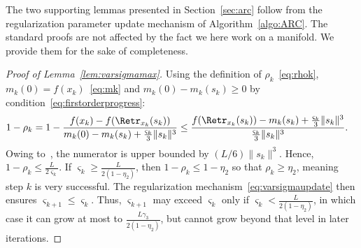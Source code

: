 The two supporting lemmas presented in Section~\ref{sec:arc} follow from the regularization parameter update mechanism of Algorithm~\ref{algo:ARC}. The standard proofs are not affected by the fact we here work on a manifold. We provide them for the sake of completeness.
\begin{proof}[Proof of Lemma~\ref{lem:varsigmamax}]
	 Using the definition of $\rho_k$~\eqref{eq:rhok}, $m_k(0) = f(x_k)$~\eqref{eq:mk} and $m_k(0) - m_k(s_k) \geq 0$ by condition~\eqref{eq:firstorderprogress}: %
	\begin{align*}
		1 - \rho_k & = 1 - \frac{f(x_k) - f(\Retr_{x_k}(s_k))}{m_k(0) - m_k(s_k) + \frac{\varsigma_k}{3} \|s_k\|^3} \leq  \frac{f(\Retr_{x_k}(s_k)) - m_k(s_k) + \frac{\varsigma_k}{3} \|s_k\|^3}{\frac{\varsigma_k}{3} \|s_k\|^3}.
	\end{align*}
	Owing to~, the numerator is upper bounded by $(L/6)\|s_k\|^3$. Hence, $1 - \rho_k \leq \frac{L}{2\varsigma_k}$. If $\varsigma_k \geq \frac{L}{2(1-\eta_2)}$, then $1-\rho_k \leq 1-\eta_2$ so that $\rho_k \geq \eta_2$, meaning step $k$ is very successful. The regularization mechanism~\eqref{eq:varsigmaupdate} then ensures $\varsigma_{k+1} \leq \varsigma_k$.
	Thus, $\varsigma_{k+1}$ may exceed $\varsigma_k$ only if $\varsigma_k < \frac{L}{2(1-\eta_2)}$, in which case it can grow at most to $\frac{L\gamma_3}{2(1-\eta_2)}$, but cannot grow beyond that level in later iterations.
%	
\end{proof}

